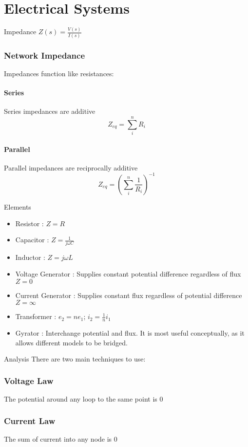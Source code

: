 \documentclass{../templates/topic}
\begin{document}
\chapter{Electrical Systems}

\begin{section}{Impedance}
	 $Z(s)=\frac{V(s)}{I(s)}$
	
	\subsection{Network Impedance}
	Impedances function like resistances:
	\subsubsection*{Series}
	Series impedances are additive
	\begin{equation}
		Z_{eq} = \sum_{i}^{n}{R_i}
	\end{equation}
	\subsubsection*{Parallel}
	Parallel impedances are reciprocally additive
	\begin{equation}
		Z_{eq} = (\sum_{i}^{n}{\frac{1}{R_i}})^{-1}
	\end{equation}
\end{section}

\begin{section}{Elements}
	\begin{itemize}
		\item Resistor : $Z=R$
		\item Capacitor : $Z=\frac{1}{j\omega C}$
		\item Inductor : $Z=j\omega L$
		\item Voltage Generator : Supplies constant potential difference regardless of flux $Z=0$
		\item Current Generator : Supplies constant flux regardless of potential difference $Z=\infty$
		\item Transformer : $e_2 = ne_1$; $i_2 = \frac{1}{n}i_1$
		\item Gyrator : Interchange potential and flux. It is most useful conceptually, as it allows different models to be bridged. 
	\end{itemize}
\end{section}


\begin{section}{Analysis}
	There are two main techniques to use:
	\subsection{Voltage Law}
		The potential around any loop to the same point is 0
	\subsection{Current Law}
		The sum of current into any node is 0
\end{section}
\end{document}
